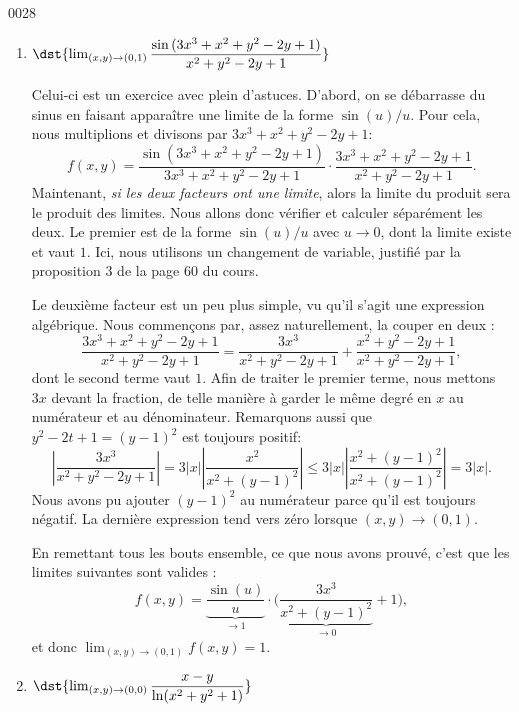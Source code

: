 \begin{corrige}{0028}
\begin{enumerate}
									    
\item  $\dst{\lim_{(x,y)\rightarrow (0,1)} \dfrac{\sin{(3x^3+x^2 + y^2 -2y+ 1)}}{x^2+y^2-2y+1}}$

	Celui-ci est un exercice avec plein d'astuces. D'abord, on se débarrasse du sinus en faisant apparaître une limite de la forme $\sin(u)/u$. Pour cela, nous multiplions et divisons par $3x^3+x^2+y^2-2y+1$:
\begin{equation}
	f(x,y)=\frac{ \sin(3x^3+x^2+y^2-2y+1) }{ 3x^3+x^2+y^2-2y+1 }\cdot\frac{ 3x^3+x^2+y^2-2y+1 }{ x^2+y^2-2y+1 }.
\end{equation}
Maintenant, \emph{si les deux facteurs ont une limite}, alors la limite du produit sera le produit des limites. Nous allons donc vérifier et calculer séparément les deux. Le premier est de la forme $\sin(u)/u$ avec $u\to 0$, dont la limite existe et vaut $1$. Ici, nous utilisons un \og changement de variable\fg{}, justifié par la proposition 3 de la page 60 du cours. 

Le deuxième facteur est un peu plus simple, vu qu'il s'agit une expression algébrique. Nous commençons par, assez naturellement, la couper en deux :
\begin{equation}
	\frac{ 3x^3+x^2+y^2-2y+1 }{ x^2+y^2-2y+1 }=\frac{ 3x^3 }{  x^2+y^2-2y+1  }+\frac{ x^2+y^2-2y+1 }{ x^2+y^2-2y+1 },
\end{equation}
dont le second terme vaut $1$. Afin de traiter le premier terme, nous mettons $3x$ devant la fraction, de telle manière à garder le même degré en $x$ au numérateur et au dénominateur. Remarquons aussi que $y^2-2t+1=(y-1)^2$ est toujours positif:
\begin{equation}
	\left|  \frac{ 3x^3 }{  x^2+y^2-2y+1  }\right|=3|x|\left|  \frac{ x^2 }{  x^2+(y-1)^2  }\right|\leq 3| x |\left|\frac{ x^2+(y-1)^2 }{  x^2+(y-1)^2  }\right|=3| x |.
\end{equation}
Nous avons pu ajouter $(y-1)^2$ au numérateur parce qu'il est toujours négatif. La dernière expression tend vers zéro lorsque $(x,y)\to(0,1)$.

En remettant tous les bouts ensemble, ce que nous avons prouvé, c'est que les limites suivantes sont valides :
\begin{equation}
	f(x,y)=\underbrace{\frac{ \sin(u) }{ u }}_{\to 1}\cdot\Big( \underbrace{\frac{ 3x^3 }{ x^2+(y-1)^2 }}_{\to 0}+1 \Big),
\end{equation}
et donc $\lim_{(x,y)\to(0,1)}f(x,y)=1$.


\item   $\dst{\lim_{(x,y)\rightarrow (0,0)} \dfrac{x-y}{\ln(x^2+y^2+1)}}$
																	    

\end{enumerate}
\end{corrige}
